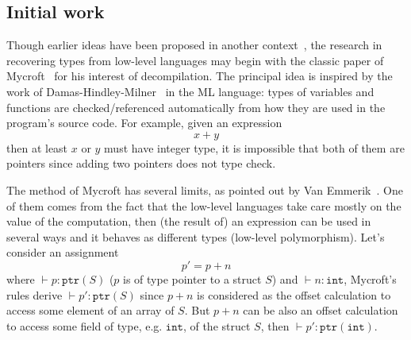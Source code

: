 \documentclass[compsoc,conference,a4paper,10pt,times]{IEEEtran}
\begin{document}
\subsection{Initial work}
\noindent
Though earlier ideas have been proposed in another context~\cite{shivers_data-flow_1990},
the research in recovering types from low-level languages may begin with the classic paper of
Mycroft~\cite{mycroft_type-based_1999} for his interest of decompilation. The principal idea is
inspired by the work of Damas-Hindley-Milner~\cite{milner_theory_1978,hindley_principal_1969,damas_principal_1982} in
the ML language: types of variables and functions are checked/referenced automatically
from how they are used in the program's source code. For example, given an expression
\begin{equation*}
  x + y
\end{equation*}
then at least $x$ or $y$ must have integer type, it is impossible that both of them are pointers
since adding two pointers does not type check.

The method of Mycroft has several limits, as pointed out by Van Emmerik~\cite{van_emmerik_static_2007}.
One of them comes from the fact that the low-level languages take care mostly on the value of
the computation, then (the result of) an expression can be used in several ways and it behaves as
different types (low-level polymorphism). Let's consider an assignment
\begin{equation*}
  p' = p + n
\end{equation*}
where $\vdash p \colon \mathtt{ptr}(S)$ ($p$ is of type pointer to a struct $S$) and
$\vdash n \colon \mathtt{int}$, Mycroft's
rules derive $\vdash p' \colon \mathtt{ptr}(S)$ since $p + n$ is considered as the offset calculation to
access some element of an array of $S$. But $p + n$ can be also an
offset calculation to access some field of type, e.g. $\mathtt{int}$, of the struct $S$,
then $\vdash p' \colon \mathtt{ptr}(\mathtt{int})$.
\end{document}
